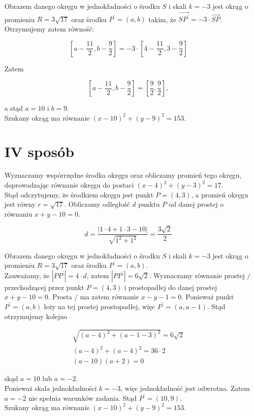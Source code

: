 \documentclass[10pt]{article}
\begin{document}
Obrazem danego okręgu w jednokładności o środku $S$ i skali $k=-3$ jest okrąg o promieniu $R=3 \sqrt{17}$ oraz środku $P^{\prime}=(a, b)$ takim, że $\overrightarrow{S P^{\prime}}=-3 \cdot \overrightarrow{S P}$. Otrzymujemy zatem równość:

$$
\left[a-\frac{11}{2}, b-\frac{9}{2}\right]=-3 \cdot\left[4-\frac{11}{2}, 3-\frac{9}{2}\right]
$$

Zatem

$$
\left[a-\frac{11}{2}, b-\frac{9}{2}\right]=\left[\frac{9}{2}, \frac{9}{2}\right],
$$

a stąd $a=10$ i $b=9$.\\
Szukany okrąg ma równanie $(x-10)^{2}+(y-9)^{2}=153$.

\section*{IV sposób}
Wyznaczamy wspórrzędne środka okręgu oraz obliczamy promień tego okręgu, doprowadzając równanie okręgu do postaci $(x-4)^{2}+(y-3)^{2}=17$.\\
Stąd odczytujemy, że środkiem okręgu jest punkt $P=(4,3)$, a promień okręgu jest równy $r=\sqrt{17}$. Obliczamy odległość $d$ punktu $P$ od danej prostej o równaniu $x+y-10=0$.

$$
d=\frac{|1 \cdot 4+1 \cdot 3-10|}{\sqrt{1^{2}+1^{2}}}=\frac{3 \sqrt{2}}{2}
$$

Obrazem danego okręgu w jednokładności o środku $S$ i skali $k=-3$ jest okrąg o promieniu $R=3 \sqrt{17}$ oraz środku $P^{\prime}=(a, b)$.\\
Zauważamy, że $\left|P P^{\prime}\right|=4 \cdot d$, zatem $\left|P P^{\prime}\right|=6 \sqrt{2}$. Wyznaczamy równanie prostej $/$ przechodzącej przez punkt $P=(4,3)$ i prostopadłej do danej prostej $x+y-10=0$. Prosta $/$ ma zatem równanie $x-y-1=0$. Ponieważ punkt $P^{\prime}=(a, b)$ leży na tej prostej prostopadłej, więc $P^{\prime}=(a, a-1)$. Stąd otrzymujemy kolejno

$$
\begin{gathered}
\sqrt{(a-4)^{2}+(a-1-3)^{2}}=6 \sqrt{2} \\
(a-4)^{2}+(a-4)^{2}=36 \cdot 2 \\
(a-10)(a+2)=0
\end{gathered}
$$

skąd $a=10$ lub $a=-2$.\\
Ponieważ skala jednokładności $k=-3$, więc jednokładność jest odwrotna. Zatem $a=-2$ nie spełnia warunków zadania. Stąd $P^{\prime}=(10,9)$.\\
Szukany okrąg ma równanie $(x-10)^{2}+(y-9)^{2}=153$.
\end{document}
